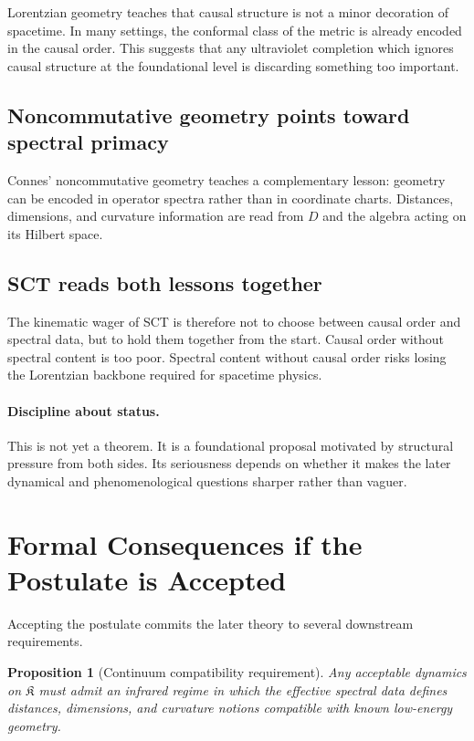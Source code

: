 \documentclass[12pt,a4paper]{article}
\theoremstyle{postulate}
\newtheorem{proposition}{Proposition}[section]
\newcommand{\Dirac}{D}
\newcommand{\Kset}{\mathfrak{K}}
\begin{document}
Lorentzian geometry teaches that causal structure is not a minor decoration
of spacetime.  In many settings, the conformal class of the metric is already
encoded in the causal order.  This suggests that any ultraviolet completion
which ignores causal structure at the foundational level is discarding
something too important.

\subsection{Noncommutative geometry points toward spectral primacy}

Connes' noncommutative geometry teaches a complementary lesson: geometry can
be encoded in operator spectra rather than in coordinate charts.  Distances,
dimensions, and curvature information are read from $\Dirac$ and the algebra
acting on its Hilbert space.

\subsection{SCT reads both lessons together}

The kinematic wager of SCT is therefore not to choose between causal order
and spectral data, but to hold them together from the start.  Causal order
without spectral content is too poor.  Spectral content without causal order
risks losing the Lorentzian backbone required for spacetime physics.

\paragraph{Discipline about status.}
This is not yet a theorem.  It is a foundational proposal motivated by
structural pressure from both sides.  Its seriousness depends on whether it
makes the later dynamical and phenomenological questions sharper rather than
vaguer.

\section{Formal Consequences if the Postulate is Accepted}
\label{sec:consequences}

Accepting the postulate commits the later theory to several downstream
requirements.

\begin{proposition}[Continuum compatibility requirement]
Any acceptable dynamics on $\Kset$ must admit an infrared regime in which the
effective spectral data defines distances, dimensions, and curvature notions
compatible with known low-energy geometry.
\end{proposition}
\end{document}
